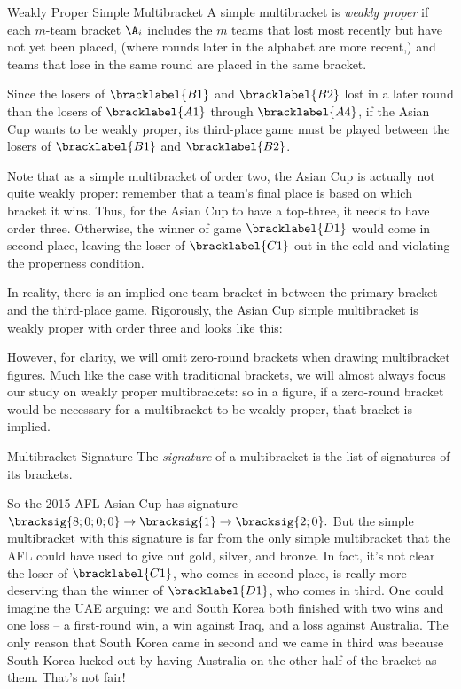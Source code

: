 {    \begin{definition}{Weakly Proper Simple Multibracket}{}
        A simple multibracket is \textit{weakly proper} if each $m$-team bracket $\A_i$ includes the $m$ teams that lost most recently but have not yet been placed, (where rounds later in the alphabet are more recent,) and teams that lose in the same round are placed in the same bracket.
    \end{definition}

    Since the losers of $\bracklabel{B1}$ and $\bracklabel{B2}$ lost in a later round than the losers of $\bracklabel{A1}$ through $\bracklabel{A4}$, if the Asian Cup wants to be weakly proper, its third-place game must be played between the losers of $\bracklabel{B1}$ and $\bracklabel{B2}$.

    Note that as a simple multibracket of order two, the Asian Cup is actually not quite weakly proper: remember that a team's final place is based on which bracket it wins. Thus, for the Asian Cup to have a top-three, it needs to have order three. Otherwise, the winner of game $\bracklabel{D1}$ would come in second place, leaving the loser of $\bracklabel{C1}$ out in the cold and violating the properness condition.

    In reality, there is an implied one-team bracket in between the primary bracket and the third-place game. Rigorously, the Asian Cup simple multibracket is weakly proper with order three and looks like this:


    However, for clarity, we will omit zero-round brackets when drawing multibracket figures. Much like the case with traditional brackets, we will almost always focus our study on weakly proper multibrackets: so in a figure, if a zero-round bracket would be necessary for a multibracket to be weakly proper, that bracket is implied.

    \begin{definition}{Multibracket Signature}{}
        The \textit{signature} of a multibracket is the list of signatures of its brackets.
    \end{definition}

    So the 2015 AFL Asian Cup has signature $\bracksig{8;0;0;0} \to \bracksig{1} \to \bracksig{2;0}.$ But the simple multibracket with this signature is far from the only simple multibracket that the AFL could have used to give out gold, silver, and bronze. In fact, it's not clear the loser of $\bracklabel{C1}$, who comes in second place, is really more deserving than the winner of $\bracklabel{D1}$, who comes in third. One could imagine the UAE arguing: we and South Korea both finished with two wins and one loss -- a first-round win, a win against Iraq, and a loss against Australia. The only reason that South Korea came in second and we came in third was because South Korea lucked out by having Australia on the other half of the bracket as them. That's not fair!

}
